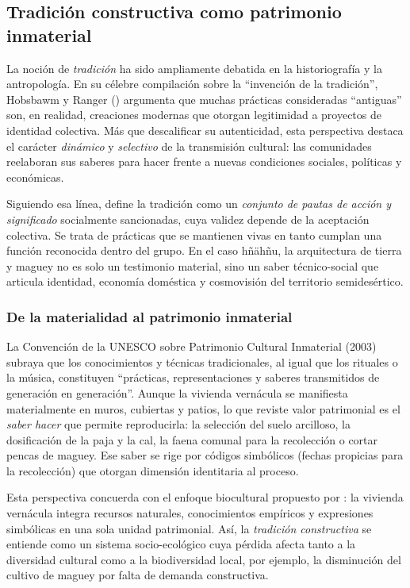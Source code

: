 \subsection{Tradición constructiva como patrimonio inmaterial}
\label{subsec:tradicion_constructiva}

La noción de \emph{tradición} ha sido ampliamente debatida en la
historiografía y la antropología.  En su célebre compilación sobre la
\enquote{invención de la tradición}, Hobsbawm y Ranger (\citeyear{hobsbawm1983inventar})
argumenta que muchas prácticas consideradas “antiguas” son, en realidad,
creaciones modernas que otorgan legitimidad a proyectos de identidad
colectiva.  Más que descalificar su autenticidad, esta perspectiva
destaca el carácter \emph{dinámico} y \emph{selectivo} de la
transmisión cultural: las comunidades reelaboran sus saberes para hacer
frente a nuevas condiciones sociales, políticas y económicas.

Siguiendo esa línea, \citeauthor{herrejon1994} define la tradición como
un \emph{conjunto de pautas de acción y significado}
socialmente sancionadas, cuya validez depende de la aceptación
colectiva.\citep{herrejon1994}  Se trata de prácticas que se
mantienen vivas en tanto cumplan una función reconocida dentro del
grupo.  En el caso hñähñu, la arquitectura de tierra y maguey no es
solo un testimonio material, sino un saber técnico-social que articula
identidad, economía doméstica y cosmovisión del territorio
semidesértico.

\subsubsection{De la materialidad al patrimonio inmaterial}

La Convención de la UNESCO sobre Patrimonio Cultural Inmaterial (2003)
subraya que los conocimientos y técnicas
tradicionales, al igual que los rituales o la música, constituyen
``prácticas, representaciones y saberes transmitidos de
generación en generación''.  Aunque la vivienda vernácula se manifiesta
materialmente en muros, cubiertas y patios, lo que reviste valor
patrimonial es el \emph{saber hacer} que permite reproducirla: la
selección del suelo arcilloso, la dosificación de la paja y la cal, la
faena comunal para la recolección o cortar pencas de maguey. Ese saber
se rige por códigos simbólicos (fechas propicias
para la recolección) que otorgan dimensión identitaria al proceso.

Esta perspectiva concuerda con el enfoque biocultural propuesto por
\cite{chang2010patrimonio}: la vivienda
vernácula integra recursos naturales, conocimientos empíricos y
expresiones simbólicas en una sola unidad patrimonial.  Así, la
\emph{tradición constructiva} se entiende como un sistema
socio-ecológico cuya pérdida afecta tanto a la diversidad cultural como
a la biodiversidad local, por ejemplo, la disminución del cultivo de
maguey por falta de demanda constructiva.


